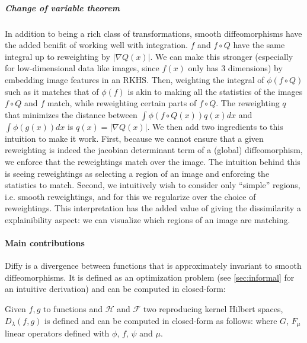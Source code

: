 \subparagraph{Change of variable theorem}
In addition to being a rich class of transformations, smooth diffeomorphisms have the added benifit of working well with integration.
$f$ and $f \circ Q$ have the same integral up to reweighting by $\vert \nabla Q(x)\vert$. We can make this stronger (especially for low-dimensional data like images, since $f(x)$ only has 3 dimensions) by embedding image features in an RKHS. Then, weighting the integral of $\phi(f \circ Q)$ such as it matches that of $\phi(f)$ is akin to making all the statistics of the images $f\circ Q$ and $f$ match, while reweighting certain parts of $f\circ Q$. The reweighting $q$ that minimizes the distance between $\int \phi(f\circ Q(x))q(x)dx$ and $\int \phi(g(x))dx$ is $q(x) = \vert \nabla Q(x)\vert$. We then add two ingredients to this intuition to make it work. First, because we cannot ensure that a given reweighting is indeed the jacobian determinant term of a (global) diffeomorphism, we enforce that the reweightings match over the image. The intuition behind this is seeing reweightings as selecting a region of an image and enforcing the statistics to match. Second, we intuitively wish to consider only ``simple'' regions, i.e. smooth reweightings, and for this we regularize over the choice of reweightings. This interpretation has the added value of giving the dissimilarity a explainibility aspect: we can visualize which regions of an image are matching.

\paragraph{Main contributions}
Diffy is a divergence between functions that is approximately invariant to smooth diffeomorphisms.
It is defined as an optimization problem (see \cref{sec:informal} for an intuitive derivation) and can be computed in closed-form:
\begin{mdframed}
\begin{informaltheorem}
Given $f, g$ to functions and $\mathcal H$ and $\mathcal F$ two reproducing kernel Hilbert spaces, $D_\lambda(f, g)$ is defined and can be computed in closed-form as follows:
where $G$, $F_\mu$ linear operators defined with $\phi$, $f$, $\psi$ and $\mu$.
\end{informaltheorem}
\end{mdframed}

